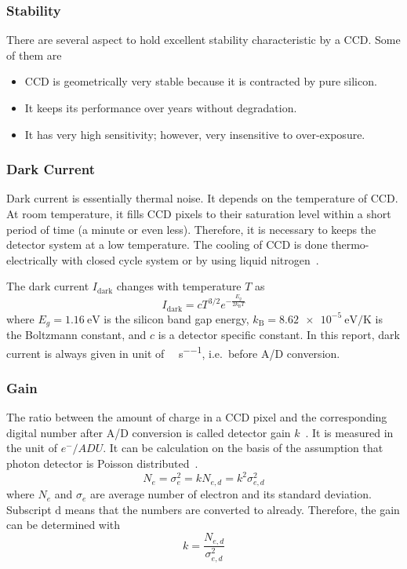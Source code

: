 \subsubsection{Stability}
There are several aspect to hold excellent stability characteristic by a CCD. Some of them are
\begin{itemize}
	\item CCD is geometrically very stable because it is contracted by pure silicon.
	\item It keeps its performance over years without degradation.
	\item It has very high sensitivity; however, very insensitive to over-exposure.
\end{itemize}

\subsubsection{Dark Current}
Dark current is essentially thermal noise. It depends on the temperature of CCD. At room temperature, it fills CCD pixels to their saturation level within a short period of time (a minute or even less). Therefore, it is necessary to keeps the detector system at a low temperature. The cooling of CCD is done thermo-electrically with closed cycle system or by using liquid nitrogen~\cite{manual}.

The dark current $ {I}_{\text{dark}} $ changes  with temperature  $T$ as
\begin{equation}
{I}_{\text{dark}}=c {T}^{3/2} e^{-{\frac{{E}_{{g}}}{2k_{\text{B}}{T}}}}
\label{Equ:DarkCurrent}
\end{equation}
where $ {E}_{{g}}= \SI{1.16}{\eV} $ is the silicon band gap energy, $ k_{\text{B}}=\SI{8.62e-5 }{\eV\per\kelvin}$ is the Boltzmann constant, and $ c $ is a detector specific constant. In this report, dark current is always given in unit of \si{\ele\per\px\per\s}, i.e.~before A/D conversion.

\subsubsection{Gain}
The ratio between the amount of charge in a CCD pixel and the corresponding digital number after A/D conversion is called detector gain $k$~\cite{manual}. It is measured in the unit of $ e^{-}/\si{ADU} $. It can be calculation on the basis of the assumption that photon detector is Poisson distributed~\cite{manual}.
\begin{equation}
	{N}_{e}= \sigma^2_{e}= k{N}_{e, {d}}= k^2 {\sigma}^2_{e,{d}}
\end{equation}
where ${N}_{e}$ and $ \sigma_{e} $ are average number of electron and its standard deviation. Subscript $\text{d}$ means that the numbers are converted to \si{\ADU} already. Therefore, the gain can be determined with
\begin{equation}
k=\frac{{N}_{e, {d}}}{\sigma^2_{e,{d}}}
\label{math:gain}
\end{equation} 

